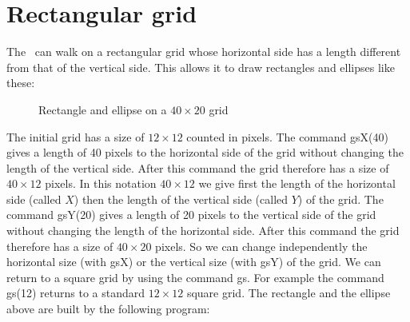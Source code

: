 \section{Rectangular grid}

The \robot\ can walk on a rectangular grid whose horizontal side has a length
different from that of the
vertical side. This allows it to draw rec\-tan\-gles and el\-lip\-ses like these:
\begin{figure}[htbp]
 \caption{Rectangle and ellipse on a $40 \times 20$ grid}
\end{figure}

 The initial grid has a size of $12 \times 12$ counted in pixels. The command {\idt gsX(40)} gives
 a length of 40 pixels to the horizontal side of the grid without changing the length of the vertical side. After
 this command the grid therefore has a size of $40 \times 12$ pixels. In this notation $40 \times 12$ we give
 first the length of the horizontal side (called $X$) then the length of the vertical side (called $Y$)
 of the grid. The command {\idt gsY(20)} gives
 a length of 20 pixels to the vertical side of the grid without changing the length of the horizontal side. After
 this command the grid therefore has a size of $40 \times 20$ pixels. So we can change independently the
  horizontal size (with {\idt gsX}) or the vertical size (with {\idt gsY}) of the grid.
  We can return to a square grid by using the command {\idt gs}.
  For example the command {\idt gs(12)}
  returns to a standard $12 \times 12$ square grid. The rectangle and the ellipse
 above
  are built by the following program:\hfill
 

